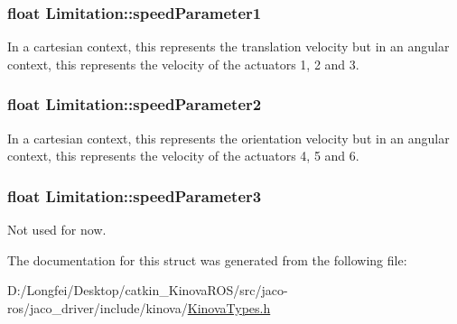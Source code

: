 \subsubsection[{\texorpdfstring{speed\+Parameter1}{speedParameter1}}]{\setlength{\rightskip}{0pt plus 5cm}float Limitation\+::speed\+Parameter1}\hypertarget{structLimitation_a3d36f2f90548acecb3e080d8c47d00f2}{}\label{structLimitation_a3d36f2f90548acecb3e080d8c47d00f2}


In a cartesian context, this represents the translation velocity but in an angular context, this represents the velocity of the actuators 1, 2 and 3. 

\subsubsection[{\texorpdfstring{speed\+Parameter2}{speedParameter2}}]{\setlength{\rightskip}{0pt plus 5cm}float Limitation\+::speed\+Parameter2}\hypertarget{structLimitation_aa17c9688bba54c9a8e2208d38266ae93}{}\label{structLimitation_aa17c9688bba54c9a8e2208d38266ae93}


In a cartesian context, this represents the orientation velocity but in an angular context, this represents the velocity of the actuators 4, 5 and 6. 

\subsubsection[{\texorpdfstring{speed\+Parameter3}{speedParameter3}}]{\setlength{\rightskip}{0pt plus 5cm}float Limitation\+::speed\+Parameter3}\hypertarget{structLimitation_a3d2e542a721c712b06b70f554d10d468}{}\label{structLimitation_a3d2e542a721c712b06b70f554d10d468}
Not used for now. 

The documentation for this struct was generated from the following file\+:\begin{DoxyCompactItemize}
\item 
D\+:/\+Longfei/\+Desktop/catkin\+\_\+\+Kinova\+R\+O\+S/src/jaco-\/ros/jaco\+\_\+driver/include/kinova/\hyperlink{KinovaTypes_8h}{Kinova\+Types.\+h}\end{DoxyCompactItemize}
